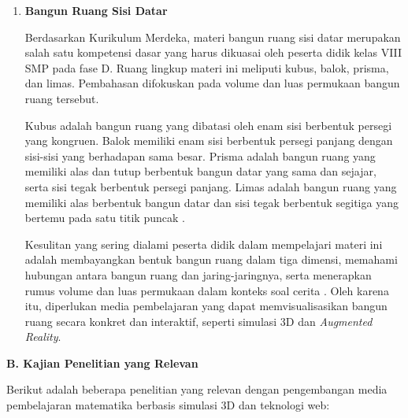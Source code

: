\begin{enumerate}
    \item \textbf{Bangun Ruang Sisi Datar}
    
    \hspace*{1cm}Berdasarkan Kurikulum Merdeka, materi bangun ruang sisi datar merupakan salah satu kompetensi dasar yang harus dikuasai oleh peserta didik kelas VIII SMP pada fase D. Ruang lingkup materi ini meliputi kubus, balok, prisma, dan limas. Pembahasan difokuskan pada volume dan luas permukaan bangun ruang tersebut.
    
    \hspace*{1cm}Kubus adalah bangun ruang yang dibatasi oleh enam sisi berbentuk persegi yang kongruen. Balok memiliki enam sisi berbentuk persegi panjang dengan sisi-sisi yang berhadapan sama besar. Prisma adalah bangun ruang yang memiliki alas dan tutup berbentuk bangun datar yang sama dan sejajar, serta sisi tegak berbentuk persegi panjang. Limas adalah bangun ruang yang memiliki alas berbentuk bangun datar dan sisi tegak berbentuk segitiga yang bertemu pada satu titik puncak \citep{kemdikbud2018}.
    
    \hspace*{1cm}Kesulitan yang sering dialami peserta didik dalam mempelajari materi ini adalah membayangkan bentuk bangun ruang dalam tiga dimensi, memahami hubungan antara bangun ruang dan jaring-jaringnya, serta menerapkan rumus volume dan luas permukaan dalam konteks soal cerita \citep{nctm2000}. Oleh karena itu, diperlukan media pembelajaran yang dapat memvisualisasikan bangun ruang secara konkret dan interaktif, seperti simulasi 3D dan \textit{Augmented Reality}.

\end{enumerate}

\textbf{B. Kajian Penelitian yang Relevan}

\hspace*{1cm}Berikut adalah beberapa penelitian yang relevan dengan pengembangan media pembelajaran matematika berbasis simulasi 3D dan teknologi web:

